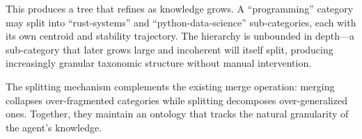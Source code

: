 This produces a tree that refines as knowledge grows. A ``programming''
category may split into ``rust-systems'' and ``python-data-science''
sub-categories, each with its own centroid and stability trajectory.
The hierarchy is unbounded in depth---a sub-category that later grows
large and incoherent will itself split, producing increasingly granular
taxonomic structure without manual intervention.

The splitting mechanism complements the existing merge operation: merging
collapses over-fragmented categories while splitting decomposes
over-generalized ones. Together, they maintain an ontology that tracks
the natural granularity of the agent's knowledge.
